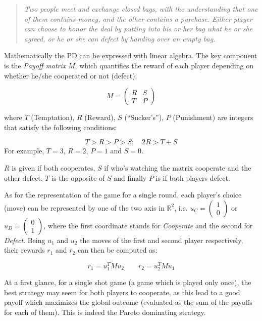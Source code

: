 \documentclass[journal,a4paper,10pt,twoside]{IEEEtran}
\begin{document}
\begin{quote}
\textit{Two people meet and exchange closed bags, with the understanding that one of them contains money, and the other contains a purchase. Either player can choose to honor the deal by putting into his or her bag what he or she agreed, or he or she can defect by handing over an empty bag.}
\end{quote}

Mathematically the PD can be expressed with linear algebra. The key component is the \textit{Payoff matrix} $M$, which quantifies the reward of each player depending on whether he/she cooperated or not (defect):

$$
M = 
\begin{pmatrix} 
R & S \\
T & P 
\end{pmatrix}
$$

where $T$ (Temptation), $R$ (Reward), $S$ (``Sucker's''), $P$ (Punishment) are integers that satisfy the following conditions:

$$
T>R>P>S; \quad 2R > T+S 
$$
For example, $T=3$, $R=2$, $P=1$ and $S=0$.

$R$ is given if both cooperates, $S$ if who's watching the matrix cooperate and the other defect, $T$ is the opposite of $S$ and finally $P$ is if both players defect.

As for the representation of the game for a single round, each player's choice (move) can be represented by one of the two axis in $\mathbb{R}^2$, i.e. $u_C=\begin{pmatrix} 1 \\ 0 \end{pmatrix}$ or $u_D=\begin{pmatrix} 0 \\ 1 \end{pmatrix}$, where the first coordinate stands for \textit{Cooperate} and the second for \textit{Defect}. Being $u_1$ and $u_2$ the moves of the first and second player respectively, their rewards $r_1$ and $r_2$ can then be computed as:

$$
r_1 = u_1^T M u_2
\quad
\quad
r_2 = u_2^T M u_1
$$

At a first glance, for a single shot game (a game which is played only once), the best strategy may seem for both players to cooperate, as this lead to a good payoff which maximizes the global outcome (evaluated as the sum of the payoffs for each of them). This is indeed the Pareto dominating strategy. 
\end{document}
